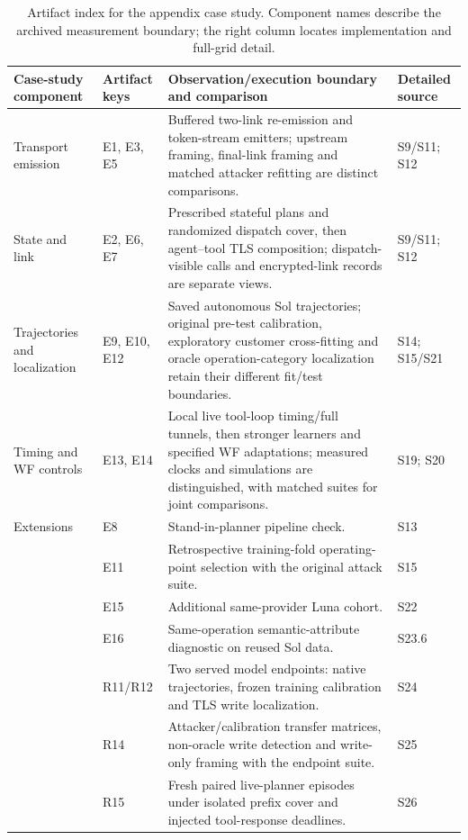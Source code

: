 \begin{table}[!t]\centering\footnotesize
\caption{Artifact index for the appendix case study. Component names describe the archived measurement boundary; the right column locates implementation and full-grid detail.}\label{tab:r9-experiment-index}
\begin{tabularx}{\textwidth}{@{}p{}p{}Xp{}@{}}\toprule
Case-study component & Artifact keys & Observation/execution boundary and comparison & Detailed source\\\midrule
Transport emission & E1, E3, E5 & Buffered two-link re-emission and token-stream emitters; upstream framing, final-link framing and matched attacker refitting are distinct comparisons. & S9/S11; S12\\
State and link & E2, E6, E7 & Prescribed stateful plans and randomized dispatch cover, then agent--tool TLS composition; dispatch-visible calls and encrypted-link records are separate views. & S9/S11; S12\\
Trajectories and localization & E9, E10, E12 & Saved autonomous Sol trajectories; original pre-test calibration, exploratory customer cross-fitting and oracle operation-category localization retain their different fit/test boundaries. & S14; S15/S21\\
Timing and WF controls & E13, E14 & Local live tool-loop timing/full tunnels, then stronger learners and specified WF adaptations; measured clocks and simulations are distinguished, with matched suites for joint comparisons. & S19; S20\\\midrule
Extensions & E8 & Stand-in-planner pipeline check. & S13\\
& E11 & Retrospective training-fold operating-point selection with the original attack suite. & S15\\
& E15 & Additional same-provider Luna cohort. & S22\\
& E16 & Same-operation semantic-attribute diagnostic on reused Sol data. & S23.6\\
& R11/R12 & Two served model endpoints: native trajectories, frozen training calibration and TLS write localization. & S24\\
& R14 & Attacker/calibration transfer matrices, non-oracle write detection and write-only framing with the endpoint suite. & S25\\
& R15 & Fresh paired live-planner episodes under isolated prefix cover and injected tool-response deadlines. & S26\\\bottomrule
\end{tabularx}\end{table}
